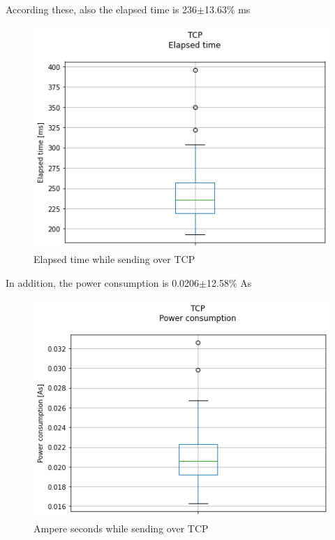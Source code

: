 \linebreak\linebreak
According these, also the elapsed time is 236$\pm$13.63\% ms
\linebreak
\begin{figure}[h!]
\centering
\includegraphics[width = 0.7 \linewidth]{fig/udp_tcp/tcp_boxplot_time.png}
\caption{Elapsed time while sending over TCP}
\label{fig:tcp_boxplot_time}
\end{figure}
\linebreak
In addition, the power consumption is 0.0206$\pm$12.58\% As
\linebreak
\begin{figure}[h!]
\centering
\includegraphics[width = 0.7 \linewidth]{fig/udp_tcp/tcp_boxplot_As.png}
\caption{Ampere seconds while sending over TCP}
\label{fig:tcp_boxplot_As}
\end{figure}
\pagebreak
